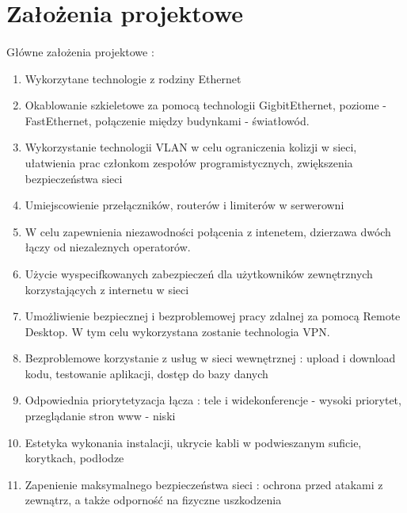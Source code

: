 \section{Założenia projektowe}
\paragraph{}
Główne założenia projektowe :
\begin{enumerate}
	\item Wykorzytane technologie z rodziny Ethernet
	\item Okablowanie szkieletowe za pomocą technologii GigbitEthernet, poziome - FastEthernet, połączenie między budynkami - światłowód.
	\item Wykorzystanie technologii VLAN w celu ograniczenia kolizji  w sieci, ułatwienia prac członkom zespołów programistycznych, zwiększenia bezpieczeństwa sieci
	\item Umiejscowienie przełączników, routerów i limiterów w serwerowni
	\item W celu zapewnienia niezawodności połącenia z intenetem, dzierzawa dwóch łączy od niezaleznych operatorów.
	\item Użycie wyspecifkowanych zabezpieczeń dla użytkowników zewnętrznych korzystających z internetu w sieci
	\item Umożliwienie bezpiecznej i bezproblemowej pracy zdalnej za pomocą Remote Desktop. W tym celu wykorzystana zostanie technologia VPN.
	\item Bezproblemowe korzystanie z usług w sieci wewnętrznej : upload i download kodu, testowanie aplikacji, dostęp do bazy danych
	\item Odpowiednia priorytetyzacja łącza : tele i widekonferencje - wysoki priorytet, przeglądanie stron www - niski
	\item Estetyka wykonania instalacji, ukrycie kabli w podwieszanym suficie, korytkach, podłodze
	\item Zapenienie maksymalnego bezpieczeństwa sieci : ochrona przed atakami z zewnątrz, a także odporność na fizyczne uszkodzenia
\end{enumerate}
